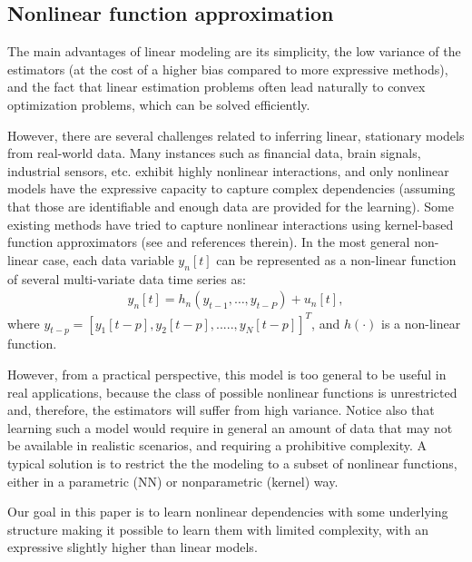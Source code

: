 \subsection{Nonlinear function approximation}

The main advantages of linear modeling are its simplicity, the low variance of the estimators (at the cost of a higher bias compared to more expressive methods), and the fact that linear estimation problems often lead naturally to convex optimization problems, which can be solved efficiently.

However, there are several challenges related to inferring linear, stationary models from real-world data. Many instances such as financial data, brain signals, industrial sensors, etc. exhibit highly nonlinear interactions, and only nonlinear models have the expressive capacity to capture complex dependencies (assuming that those are identifiable and enough data are provided for the learning). Some existing methods have tried to capture nonlinear interactions using kernel-based function approximators (see  \cite{shen2019nonlinear,money2021online} and references therein).
In the most general non-linear case, each data variable $y_n[t]$ can be represented as a non-linear function of several multi-variate data time series as:
    \begin{align} \label{eq:nonvar}
	y_n[t] =   h_n(y_{t-1},\ldots, y_{t-P}) + u_n[t],
	\end{align}
    where $y_{t-p} = [y_1[t-p],y_2[t-p],.....,y_N[t-p]]^{T}$, and $h(\cdot)$ is a non-linear function.

However, from a practical perspective, this model is too general to be useful in real applications, because the class of possible nonlinear functions is unrestricted and, therefore, the estimators will suffer from high variance. Notice also that learning such a model would require in general an amount of data that may not be available in realistic scenarios, and requiring a prohibitive complexity. A typical solution is to restrict the the modeling to a subset of nonlinear functions, either in a parametric (NN) or nonparametric (kernel) way.

Our goal in this paper is to learn nonlinear dependencies with some underlying structure making it possible to learn them with limited complexity, with an expressive slightly higher than linear models.
